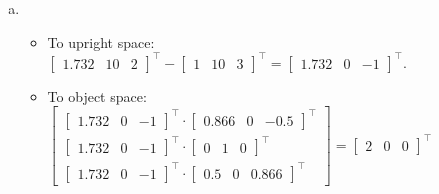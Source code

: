 \documentclass[11pt]{article}
\begin{document}
\begin{enumerate}[a.]
	\item %
	\begin{itemize}
		\item To upright space: $\begin{bmatrix}
				1.732 & 10 & 2
			\end{bmatrix}^\intercal
			- \begin{bmatrix}
				1 & 10 & 3
			\end{bmatrix}^\intercal
			= \begin{bmatrix}
				1.732 & 0 & -1
			\end{bmatrix}^\intercal$.
		\item To object space: $\begin{bmatrix}
				\begin{bmatrix}
					1.732 & 0 & -1
				\end{bmatrix}^\intercal \cdot
				\begin{bmatrix}
					0.866 & 0 & -0.5
				\end{bmatrix}^\intercal \\
				\begin{bmatrix}
					1.732 & 0 & -1
				\end{bmatrix}^\intercal \cdot
				\begin{bmatrix}
					0 & 1 & 0
				\end{bmatrix}^\intercal \\
				\begin{bmatrix}
					1.732 & 0 & -1
				\end{bmatrix}^\intercal \cdot
				\begin{bmatrix}
					0.5 & 0 & 0.866
				\end{bmatrix}^\intercal
			\end{bmatrix}=
			\begin{bmatrix}
				2 & 0 & 0
			\end{bmatrix}^\intercal
			$
	\end{itemize}
	

\end{enumerate}
\end{document}
